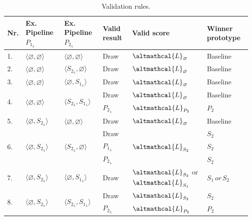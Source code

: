 \begin{table}[t]
	\footnotesize
	\centering
	\begin{threeparttable}
	\caption{
		Validation rules.
		}
	\begin{tabular}{lp{2.3cm}p{2.3cm}p{2cm}p{2cm}p{2.5cm}}
	\toprule
	Nr. & Ex. Pipeline $P_{1_{\lambda}}$ & Ex. Pipeline $P_{2_{\lambda}}$ & Valid result & Valid score & Winner prototype\\\toprule
			1. &$\langle \varnothing, \varnothing \rangle$ & $\langle \varnothing, \varnothing \rangle$ & Draw          & $\altmathcal{L}_{\varnothing}$ &  Baseline \\ \hline
			2. &$\langle \varnothing, \varnothing \rangle$ & $\langle S_{2_{\lambda}}, \varnothing \rangle$ & Draw          & $\altmathcal{L}_{\varnothing}$ & Baseline \\ \hline
			3. &$\langle \varnothing, \varnothing \rangle$ & $\langle \varnothing, S_{1_{\lambda}} \rangle$ & Draw          & $\altmathcal{L}_{\varnothing}$ & Baseline \\ \hline
			\multirow{2}{*}{4.} &\multirow{2}{*}{$\langle \varnothing, \varnothing \rangle$} & \multirow{2}{*}{$\langle S_{2_{\lambda}}, S_{1_{\lambda}} \rangle$} & Draw & $\altmathcal{L}_{\varnothing}$ & Baseline \\
			& & & $P_{2_{\lambda}}$ & $\altmathcal{L}_{P_2}$ & $P_2$\\ \hline
			5. & $\langle \varnothing, S_{2_{\lambda}} \rangle$ & $\langle \varnothing, \varnothing \rangle$ & Draw          & $\altmathcal{L}_{\varnothing}$ & Baseline \\ \hline
			\multirow{3}{*}{6.} & \multirow{3}{*}{$\langle \varnothing, S_{2_{\lambda}} \rangle$} & \multirow{3}{*}{$\langle S_{2_{\lambda}}, \varnothing \rangle$} & Draw &  \multirow{3}{*}{$\altmathcal{L}_{S_2}$}  & $S_2$ \\
			& & & $P_{1_{\lambda}}$ & & $S_2$ \\
			& & & $P_{2_{\lambda}}$ & & $S_2$ \\ \hline
			7. &$\langle \varnothing, S_{2_{\lambda}} \rangle$ & $\langle \varnothing, S_{1_{\lambda}} \rangle$ & Draw & $\altmathcal{L}_{S_2}$ or $\altmathcal{L}_{S_1}$ & $S_{1}\,or\, S_2$ \\ \hline
			\multirow{2}{*}{8.} & \multirow{2}{*}{$\langle \varnothing, S_{2_{\lambda}} \rangle$} & \multirow{2}{*}{$\langle S_{2_{\lambda}}, S_{1_{\lambda}} \rangle$} & Draw & $\altmathcal{L}_{S_2}$ & $S_2$\\
			& & & $P_{2_{\lambda}}$ & $\altmathcal{L}_{P_2}$ & $P_2$ \\ \hline

\end{tabular}
\end{threeparttable}
\end{table}

